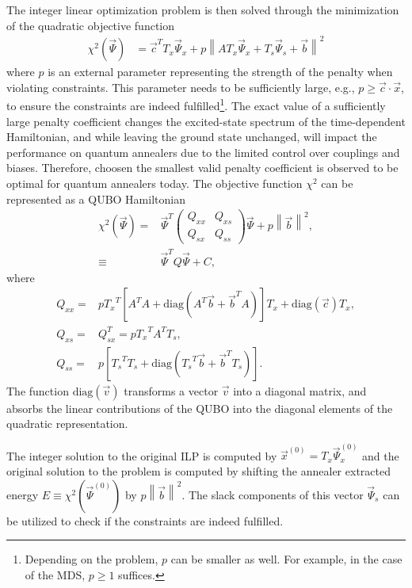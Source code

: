 \documentclass[10pt]{iopart}
\begin{document}
The integer linear optimization problem is then solved through the minimization of the quadratic objective function
\begin{align}
 \label{eq:ilp-slack-bit-energy}
 \chi^2(\vec \Psi)
 &=
 \vec c^T T_x \vec \Psi_x + p \left\| A T_x \vec \Psi_x + T_s \vec \Psi_s + \vec b \right\|^2
\end{align}
where $p$ is an external parameter representing the strength of the penalty when violating constraints.
This parameter needs to be sufficiently large, e.g., $p \geq \vec c \cdot \vec x$, to ensure the constraints are indeed fulfilled\footnote{Depending on the problem, $p$ can be smaller as well. For example, in the case of the MDS, $p\geq 1$ suffices.}.  The exact value of a sufficiently large penalty coefficient changes the excited-state spectrum of the time-dependent Hamiltonian, and while leaving the ground state unchanged, will impact the performance on quantum annealers due to the limited control over couplings and biases. Therefore, choosen the smallest valid penalty coefficient is observed to be optimal for quantum annealers today.
The objective function $\chi^2$ can be represented as a QUBO Hamiltonian
\begin{align}
 \chi^2(\vec \Psi) =    &
 \vec \Psi^T
 \begin{pmatrix}
  Q_{xx} & Q_{xs} \\
  Q_{sx} & Q_{ss}
 \end{pmatrix}
 \vec \Psi + p\left \| \vec b \right\|^2, \\
 \equiv &  \vec \Psi^T Q  \vec \Psi + C,
 \label{eq:matrix_form}
\end{align}
where
{\small
\begin{align}
 \label{eq:qubo:components}
 Q_{xx} = & p {T_{x}}^T \left[ A^T A + \mathrm{diag} \left(A^T \vec b + \vec b^T A\right) \right] T_x + \mathrm{diag}(\vec c) T_x,                                                                    \\
 Q_{xs} = & Q_{sx}^T = p {T_{x}}^T A^T T_s,                                                                     \\
 Q_{ss} = & p\left[ {T_{s}}^T T_s + \mathrm{diag}\left( {T_{s}}^T \vec b + \vec b^T T_s\right) \right].
\end{align}}
The function $\mathrm{diag}(\vec v)$ transforms a vector $\vec v$ into a diagonal matrix, and absorbs the linear contributions of the QUBO into the diagonal elements of the quadratic representation.

The integer solution to the original ILP is computed by $\vec x^{(0)} = T_x \vec \Psi_x^{(0)}$ and the original solution to the problem is computed by shifting the annealer extracted energy $E \equiv  \chi^2(\vec \Psi^{(0)}) $ by $p \left \| \vec b \right\|^2$.
The slack components of this vector $\vec \Psi_s$ can be utilized to check if the constraints are indeed fulfilled.
\end{document}
